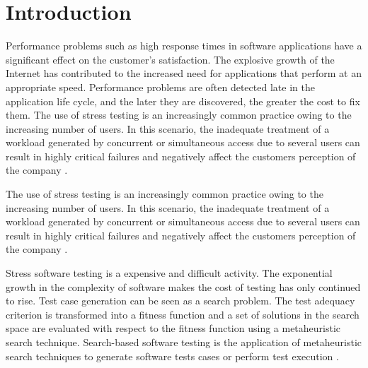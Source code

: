 \documentclass[times]{stvrauth}
\begin{document}

\maketitle


\vspace{-6pt}

\section{Introduction}

Performance problems such as high response times in software applications have a significant effect on the customer’s satisfaction. The explosive growth of the Internet has contributed to the increased need for applications that perform at an appropriate speed. Performance problems are often detected late in the application life cycle, and the later they are discovered, the greater the cost to fix them. The use of stress testing is an increasingly common practice owing to the increasing number of users. In this scenario, the inadequate treatment of a workload generated by concurrent or simultaneous access due to several users can result in highly critical failures and negatively affect the customers perception of the company \cite{Draheim2006b} \cite{Jiang2010} \cite{Molyneaux2009} \cite{Wert2014}. 

The use of stress testing is an increasingly common practice owing to the increasing number of users. In this scenario, the inadequate treatment of a workload generated by concurrent or simultaneous access due to several users can result in highly critical failures and negatively affect the customers perception of the company \cite{Draheim2006b} \cite{Jiang2010}. 

Stress software testing is a expensive and difficult activity. The exponential
growth in the complexity of software makes the cost of testing has only continued to rise. Test case generation can be seen as a search problem. The test adequacy criterion is transformed into a fitness function and a set of solutions in the search
space are evaluated with respect to the fitness function using a metaheuristic search technique. Search-based software testing is the application of metaheuristic search techniques to generate software
tests cases or perform test execution \cite{Afzal2009a} \cite{Gay}.
\end{document}
